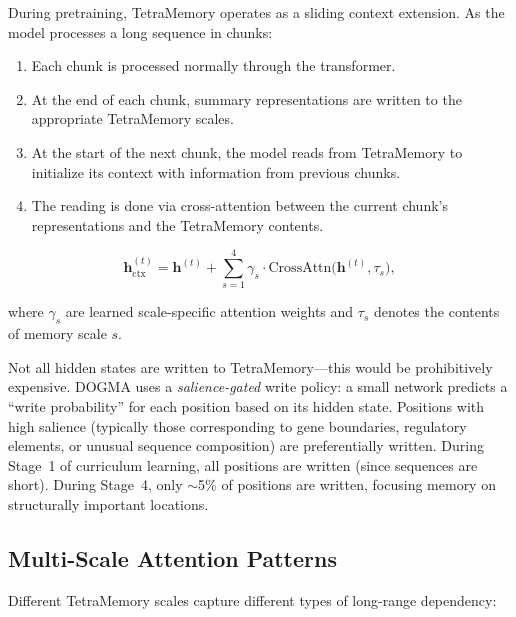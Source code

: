 During pretraining, TetraMemory operates as a sliding context extension. As the model processes a long sequence in chunks:

\begin{enumerate}[leftmargin=1.5em]
  \item Each chunk is processed normally through the transformer.
  \item At the end of each chunk, summary representations are written to the appropriate TetraMemory scales.
  \item At the start of the next chunk, the model reads from TetraMemory to initialize its context with information from previous chunks.
  \item The reading is done via cross-attention between the current chunk's representations and the TetraMemory contents.
\end{enumerate}

\begin{equation}
\mathbf{h}_{\text{ctx}}^{(t)} = \mathbf{h}^{(t)} + \sum_{s=1}^{4} \gamma_s \cdot \text{CrossAttn}\bigl(\mathbf{h}^{(t)}, \tau_s\bigr),
\label{eq:tetramem-read}
\end{equation}

where $\gamma_s$ are learned scale-specific attention weights and $\tau_s$ denotes the contents of memory scale $s$.

\begin{implnote}
Not all hidden states are written to TetraMemory---this would be prohibitively expensive. DOGMA uses a \emph{salience-gated} write policy: a small network predicts a ``write probability'' for each position based on its hidden state. Positions with high salience (typically those corresponding to gene boundaries, regulatory elements, or unusual sequence composition) are preferentially written. During Stage~1 of curriculum learning, all positions are written (since sequences are short). During Stage~4, only $\sim$5\% of positions are written, focusing memory on structurally important locations.
\end{implnote}

\subsection{Multi-Scale Attention Patterns}

Different TetraMemory scales capture different types of long-range dependency:

